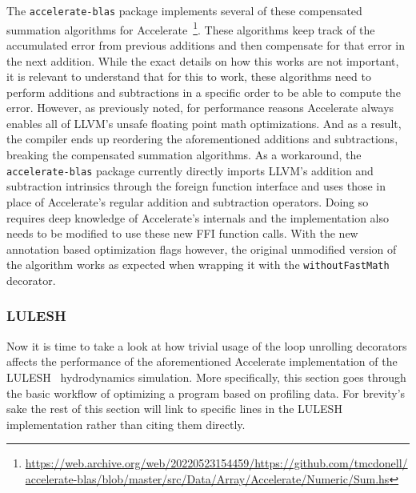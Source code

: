\documentclass[fontsize=11pt,a4paper,parskip=half,numbers=noenddot]{scrartcl}
\newcommand{\hask}[1]{\texttt{#1}}
\begin{document}
The \texttt{accelerate-blas} package implements several of these compensated
summation algorithms for
Accelerate~\footnote{\url{https://web.archive.org/web/20220523154459/https://github.com/tmcdonell/accelerate-blas/blob/master/src/Data/Array/Accelerate/Numeric/Sum.hs}}.
These algorithms keep track of the accumulated error from previous additions and
then compensate for that error in the next addition. While the exact details on
how this works are not important, it is relevant to understand that for this to
work, these algorithms need to perform additions and subtractions in a specific
order to be able to compute the error. However, as previously noted, for
performance reasons Accelerate always enables all of LLVM's unsafe floating
point math optimizations. And as a result, the compiler ends up reordering the
aforementioned additions and subtractions, breaking the compensated summation
algorithms. As a workaround, the \texttt{accelerate-blas} package currently
directly imports LLVM's addition and subtraction intrinsics through the foreign
function interface and uses those in place of Accelerate's regular addition and
subtraction operators. Doing so requires deep knowledge of Accelerate's
internals and the implementation also needs to be modified to use these new FFI
function calls. With the new annotation based optimization flags however, the
original unmodified version of the algorithm works as expected when wrapping it
with the \hask{withoutFastMath} decorator.

\subsubsection{LULESH}

Now it is time to take a look at how trivial usage of the loop unrolling
decorators affects the performance of the aforementioned Accelerate
implementation of the LULESH~\cite{karlin2013lulesh} hydrodynamics simulation.
More specifically, this section goes through the basic workflow of optimizing a
program based on profiling data. For brevity's sake the rest of this section
will link to specific lines in the LULESH implementation rather than citing them
directly.
\end{document}
